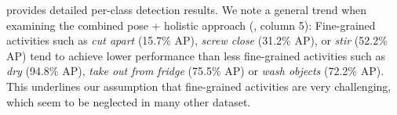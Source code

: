  provides detailed per-class detection results. 
We note a general trend when examining the combined pose + holistic approach (, column 5): 
Fine-grained activities such as \emph{cut apart} (15.7\% AP), \emph{screw close} (31.2\% AP), or \emph{stir} (52.2\% AP) tend to achieve lower performance than less fine-grained activities such as \emph{dry} (94.8\% AP), \emph{take out from fridge} (75.5\% AP) or \emph{wash objects} (72.2\% AP). 
This underlines our assumption that fine-grained activities are very challenging, which seem to be neglected in many other dataset.



% 
